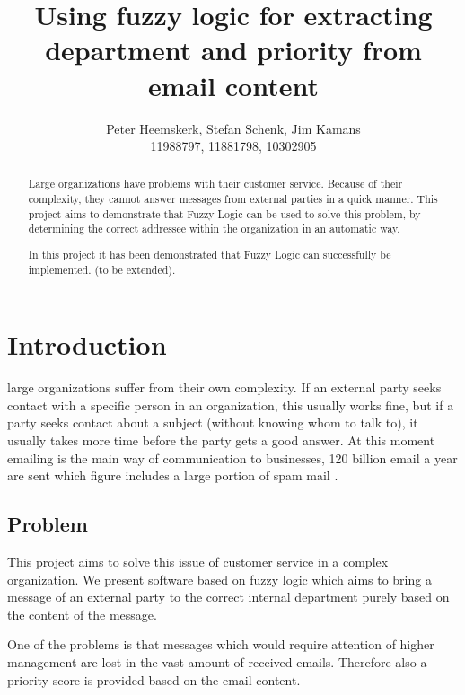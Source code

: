 \documentclass[journal]{IEEEtran}
\begin{document}
\title{Using fuzzy logic for extracting department and priority from email content}
\author{Peter Heemskerk, Stefan Schenk, Jim Kamans\\11988797, 11881798, 10302905}


\maketitle

\begin{abstract}
Large organizations have problems with their customer service. 
Because of their complexity, they cannot answer messages from external parties in a quick manner. This project aims to demonstrate that Fuzzy Logic can be used to solve this problem, by determining the correct addressee within the organization in an automatic way.

In this project it has been demonstrated that Fuzzy Logic can successfully be implemented. (to be extended).
\end{abstract}

\section{Introduction}
 large organizations suffer from their own complexity. If an external party seeks contact with a specific person in an organization, this usually works fine, but if a party seeks contact about a subject (without knowing whom to talk to), it usually takes more time before the party gets a good answer. At this moment emailing is the main way of communication to businesses, 120 billion email a year are sent which figure includes a large portion of spam mail \cite{email_statistics}.\\

\subsection{Problem}

This project aims to solve this issue of customer service in a complex organization. We present software based on fuzzy logic which aims to bring a message of an external party to the correct internal department purely based on the content of the message. 

One of the problems is that messages which would require attention of higher management are lost in the vast amount of received emails. Therefore also a priority score is provided based on the email content. 
\end{document}
